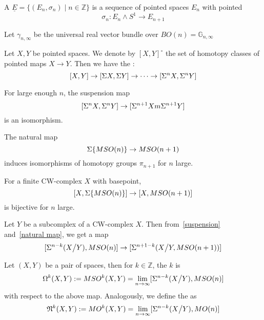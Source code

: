 \documentclass[a4paper,11pt]{article}
\begin{document}
\begin{definition}
    A  \(\underline E = \{(E_n,\sigma_n)\mid n\in\mathbb{Z}\}\) is a sequence of pointed spaces \(E_n\) with pointed \[\sigma_n:E_n\wedge{S^1}\to E_{n+1}\]
\end{definition}

\begin{definition}
    Let \(\gamma_{n,\infty}\) be the universal real vector bundle over \(BO(n)=\mathbb{G}_{n,\infty}\)
\end{definition}

\begin{theorem}\label{suspension}
    Let \(X, Y\) be pointed spaces. We denote by \({[X,Y]}^\circ\) the set of homotopy classes of pointed maps \(X\to Y\). Then we have the :
    \[[X,Y]\to[\Sigma{X},\Sigma{Y}]\to\dots\to[\Sigma^n{X},\Sigma^n{Y}]\] 
\end{theorem}


\begin{theorem}\label{freudenthal}
    For large enough \(n\), the suspension map
    \[[\Sigma^nX,\Sigma^nY]\to[\Sigma^{n+1}Xm\Sigma^{n+1}Y]\]
    is an isomorphism.
\end{theorem}


\begin{lemma}\label{natural map}\cite{thom}
    The natural map
    \[\Sigma\{MSO(n)\}\to MSO(n+1)\]
    induces isomorphisms of homotopy groups \(\pi_{n+1}\) for \(n\) large.
\end{lemma}

\begin{corollary}
    For a finite CW-complex \(X\) with basepoint, \[[X,\Sigma\{MSO(n)\}]\to[X,MSO(n+1)]\] is bijective for \(n\) large.
\end{corollary}

\begin{lemma}
    Let \(Y\) be a subcomplex of a CW-complex \(X\). Then from\ \ref{suspension} and\ \ref{natural map}, we get a map
    \[[\Sigma^{n-k}(X\big/ Y),MSO(n)]\to[\Sigma^{n+1-k}(X\big/Y, MSO(n+1))]\]
\end{lemma}

\begin{definition}
    Let \((X,Y)\) be a pair of spaces, then for \(k\in\mathbb{Z}\), the \(k\) is
    \[\Omega^k(X,Y):=MSO^k(X,Y)=\lim_{n\to\infty}[\Sigma^{n-k}(X\big/Y),MSO(n)]\]
    with respect to the above map.
    Analogously, we define the  as
    \[\mathfrak{N}^k(X,Y):= MO^k(X,Y)=\lim_{n\to\infty}[\Sigma^{n-k}(X\big/ Y),MO(n)]\]
\end{definition}
\end{document}
